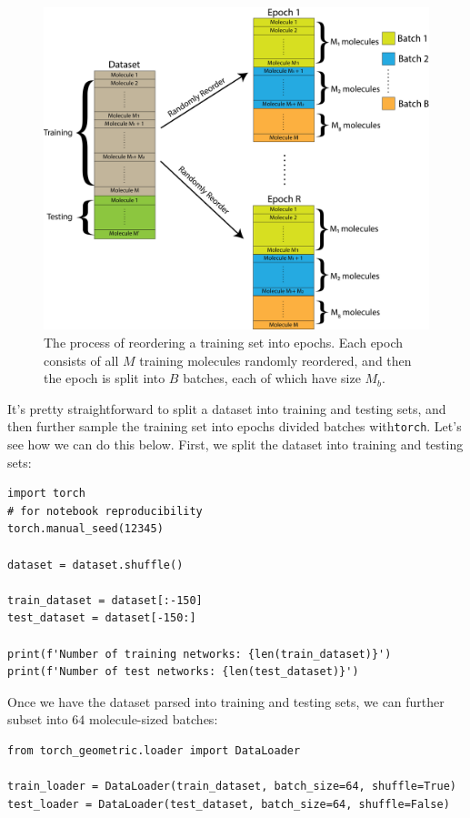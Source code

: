 \begin{figure}
    \centering
    \includegraphics[width=\linewidth]{next/Images/nn_epoch.png}
    \caption[GNN training]{The process of reordering a training set into epochs. Each epoch consists of all $M$ training molecules randomly reordered, and then the epoch is split into $B$ batches, each of which have size $M_b$.}
    \label{fig:next:gnn:training}
\end{figure}

It's pretty straightforward to split a dataset into training and testing sets, and then further sample the training set into epochs divided batches with\texttt{torch}. Let's see how we can do this below. First, we split the dataset into training and testing sets:

\begin{lstlisting}[style=python]
import torch
# for notebook reproducibility
torch.manual_seed(12345)

dataset = dataset.shuffle()

train_dataset = dataset[:-150]
test_dataset = dataset[-150:]

print(f'Number of training networks: {len(train_dataset)}')
print(f'Number of test networks: {len(test_dataset)}')
\end{lstlisting}

Once we have the dataset parsed into training and testing sets, we can further subset into $64$ molecule-sized batches:

\begin{lstlisting}[style=python]
from torch_geometric.loader import DataLoader

train_loader = DataLoader(train_dataset, batch_size=64, shuffle=True)
test_loader = DataLoader(test_dataset, batch_size=64, shuffle=False)
\end{lstlisting}

